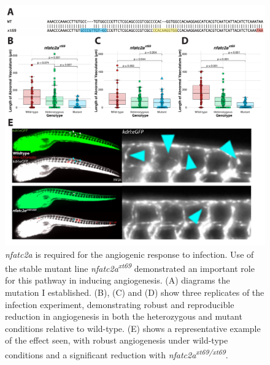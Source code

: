 \begin{figure}
\centering
\includegraphics[width=\textwidth]{images/nfatc2alarvae.pdf}
\caption{\textit{nfatc2a} is required for the angiogenic response to infection. Use of the stable mutant line \textit{nfatc2a\textsuperscript{xt69}} demonstrated an important role for this pathway in inducing angiogenesis. (A) diagrams the mutation I established. (B), (C) and (D) show three replicates of the infection experiment, demonstrating robust and reproducible reduction in angiogenesis in both the heterozygous and mutant conditions relative to wild-type. (E) shows a representative example of the effect seen, with robust angiogenesis under wild-type conditions and a significant reduction with \textit{nfatc2a\textsuperscript{xt69/xt69}}.}
\label{figure:c2larvae}
\end{figure}

